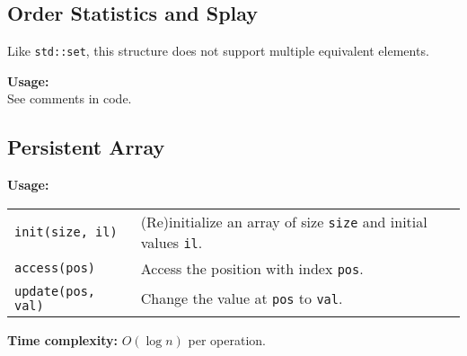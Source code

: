 \subsection{Order Statistics and Splay}
\Warning Like \lstinline|std::set|, this structure does not support multiple equivalent elements. \par
\textbf{Usage:} \\[0.1cm]
See comments in code.



%

\subsection{Persistent Array}
\textbf{Usage:} \\[0.1cm]
\begin{tabular}{p{4cm} p{7.5cm}}
  \lstinline|init(size, il)| & (Re)initialize an array of size \lstinline|size| and initial values \lstinline|il|. \\
  \lstinline|access(pos)| & Access the position with index \lstinline|pos|.\\
  \lstinline|update(pos, val)| & Change the value at \lstinline|pos| to \lstinline|val|. \\
\end{tabular} \par
\textbf{Time complexity:} $O(\log n)$ per operation. \par



